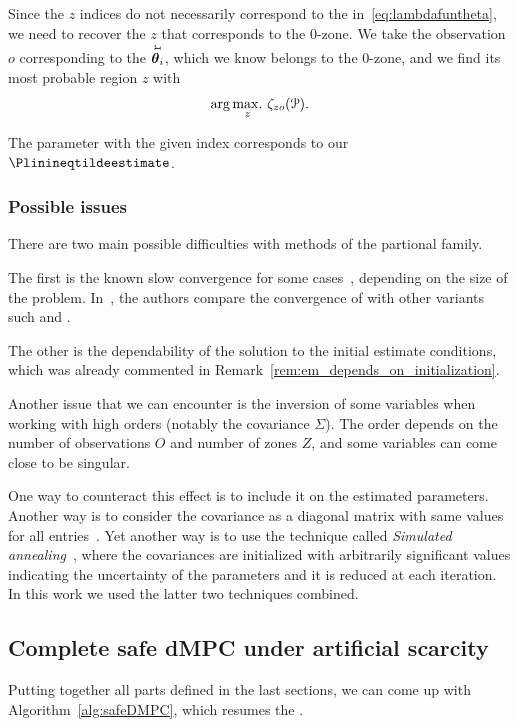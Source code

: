 \documentclass[../main.tex]{subfiles}
\begin{document}
Since the $z$ indices do not necessarily correspond to the in~\eqref{eq:lambdafuntheta}, we need to recover the $z$ that corresponds to the $0$-zone.
We take the observation $o$ corresponding to the $\thetairestricted$, which we know belongs to the $0$-zone, and we find its most probable region $z$ with
\begin{equation*}\label{eq:argmaxz}
  \arg\underset{z}{\max\!.}\ {\zeta_{zo}(\mathcal{P})}.
\end{equation*}

The parameter with the given index corresponds to our $\Plinineqtildeestimate$.

\subsubsection{Possible issues}

There are two main possible difficulties with methods of the partional family.

The first is the known slow convergence for some cases~\cite{CeleuxGovaert1992,Bishop2006,BaudryCeleux2015}, depending on the size of the problem. In~\cite{FariaSoromenho2010}, the authors compare the convergence of \EM{} with other variants such \sEM{} and \CEM{}.

The other is the dependability of the solution to the initial estimate conditions, which was already commented in Remark~\ref{rem:em_depends_on_initialization}.

Another issue that we can encounter is the inversion of some variables when working with high orders (notably the covariance $\Sigma$).
The order depends on the number of observations $O$ and number of zones $Z$, and some variables can come close to be singular.

One way to counteract this effect is to include it on the estimated parameters.
Another way is to consider the covariance as a diagonal matrix with same values for all entries~\cite{KarlisXekalaki2003}.
Yet another way is to use the technique called \emph{Simulated annealing}~\cite{CeleuxGovaert1992,OzerovFevotte2010}, where the covariances are initialized with arbitrarily significant values indicating the uncertainty of the parameters and it is reduced at each iteration.
In this work we used the latter two techniques combined.

\subsection{Complete safe dMPC under artificial scarcity}\label{sec:complete-safe-dmpc-ineq}
Putting together all parts defined in the last sections, we can come up with Algorithm~\ref{alg:safeDMPC}, which resumes the \rpdmpcas{}.
\end{document}
